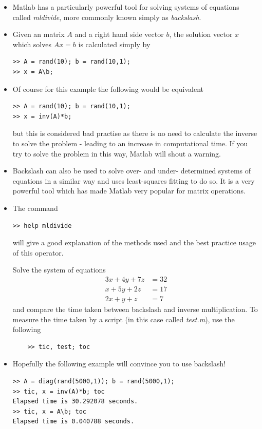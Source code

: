 \documentclass[12pt]{report}
\begin{document}
\begin{itemize}
\item Matlab has a particularly powerful tool for solving systems of equations called \textit{mldivide}, more commonly known simply as \textit{backslash}.
\item Given an matrix $A$ and a right hand side vector $b$, the solution vector $x$ which solves $Ax = b$ is calculated simply by
\begin{lstlisting}
>> A = rand(10); b = rand(10,1);
>> x = A\b;
\end{lstlisting}
\item Of course for this example the following would be equivalent
\begin{lstlisting}
>> A = rand(10); b = rand(10,1);
>> x = inv(A)*b;
\end{lstlisting}
but this is considered bad practise as there is no need to calculate the inverse to solve the problem - leading to an increase in computational time. If you try to solve the problem in this way, Matlab will shout a warning.
\item Backslash can also be used to solve over- and under- determined systems of equations in a similar way and uses least-squares fitting to do so. It is a very powerful tool which has made Matlab very popular for matrix operations.
\item The command
\begin{lstlisting}
>> help mldivide
\end{lstlisting}
will give a good explanation of the methods used and the best practice usage of this operator.
\begin{tcolorbox}[title=Task]
	Solve the system of equations 
	\begin{align*}
	3x + 4y + 7z &= 32 \\
	x + 5y + 2z &= 17 \\
	2x + y + z &= 7
	\end{align*}
	and compare the time taken between backslash and inverse multiplication.
	\tcblower
	To measure the time taken by a script (in this case called \textit{test.m}), use the following
	\begin{lstlisting}
	>> tic, test; toc
	\end{lstlisting}
\end{tcolorbox}
\item Hopefully the following example will convince you to use backslash! 
\begin{lstlisting}
>> A = diag(rand(5000,1)); b = rand(5000,1);
>> tic, x = inv(A)*b; toc
Elapsed time is 30.292078 seconds.
>> tic, x = A\b; toc
Elapsed time is 0.040788 seconds.
\end{lstlisting}
\end{itemize}
\end{document}
